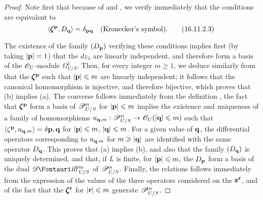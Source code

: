 \begin{proof}
Note first that because of  and , we verify immediately that the conditions  are equivalent to 
\[
  \label{IV.16.11.2.3}
  \langle \pmb{\zeta}^{\mathbf p}, D_{\mathbf q} \rangle = \delta_{\mathbf{p} \mathbf{q}} \quad (\text{Kronecker's symbol}).
  \tag{16.11.2.3}
\]

The existence of the family $(D_\mathbf{p})$ verifying these conditions implies first (by taking $|\mathbf{p}| = 1$) that the $dz_\lambda$ are linearly independent, and therefore form a basis of the $\mathscr{O}_U$-module $\Omega_{U/S}^1$.
Then, for every integer $m \geq 1$, we deduce similarly from  that the $\pmb{\zeta}^{\mathbf p}$ such that $|\mathbf{p}| \leqslant m$ are linearly independent;
it follows that the canonical homomorphism  is injective, and therefore bijective, which proves that (b) implies (a).
The converse follows immediately from the definition , the fact that $\pmb{\zeta}^{\mathbf p}$ form a basis of $\mathscr{P}_{U/S}^n$ for $|\mathbf{p}| \leqslant m$ implies the existence and uniqueness of a family of homomorphisms $u_{\bb{q}, m}: \sh{P}_{U/S}^n \to \sh{O}_U (|\bb{q}| \leq m)$ such that $\langle \zeta^{\mathbf p}, u_{\mathbf{q}, m} \rangle = \delta{\mathbf{p}, \mathbf{q}}$ for $|\mathbf{p}| \leqslant m$, $|\mathbf{q}| \leqslant m$.
For a given value of $\mathbf{q}$, the differential operators corresponding to $u_{\mathbf{q}, m}$ for $m \geqslant |\mathbf{q}|$ are identified with the same operator $D_\mathbf{q}$.
This proves that (a) implies (b), and also that the family $(D_\mathbf{q})$ is uniquely determined, and that, if $L$ is finite, for $|\mathbf{p}| \leqslant m$, the $D_\mathbf{p}$ form a basis of the dual $\shDiff_{U/S}^m$ of $\mathscr{P}_{U/S}^n$.
Finally, the relations  follows immediately from the expression of the values of the three operators considered on the $\mathbf{z}^\mathbf{r}$, and of the fact that the $\pmb{\zeta}^\mathbf{r}$ for $|\mathbf{r}| \leqslant m$ generate $\mathscr{P}_{U/S}^n$.
\end{proof}


